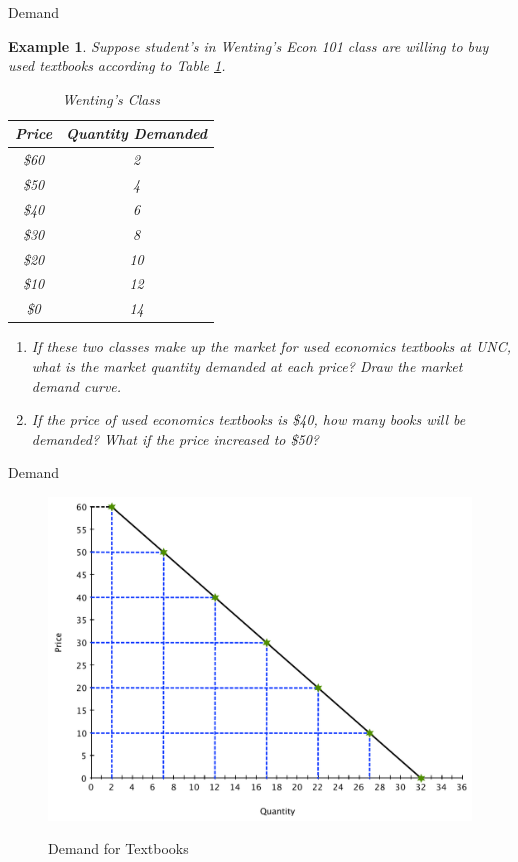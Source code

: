\documentclass[xcolor={dvipsnames},pdf, hyperref={colorlinks=true, citecolor=ForestGreen, linkcolor=BlueViolet, urlcolor=Magenta}]{beamer}
\newtheorem{exmp}{Example}[section]
\theoremstyle{definition}
\newcommand{\ddp}[1]{{\textcolor{ForestGreen}{#1}}}
\begin{document}
\begin{frame}{Demand}
		\begin{exmp} 
			\scriptsize	
				Suppose student's in Wenting's Econ 101 class are willing to buy used textbooks according to Table \ref{tab2}.
				
				\begin{table}[ht]
					\caption{Wenting's Class}
					\label{tab2}
					\centering
					\begin{tabular}{  c|c}        
						
						Price   & Quantity Demanded \\
						\hline
						\$60 & 2 \\
						\$50 & 4 \\
						\$40 & 6 \\
						\$30 &  8 \\
						\$20& 10 \\
						\$10 & 12 \\
						\$0 & 14 \\
					\end{tabular}
				\end{table} 
				
			\begin{enumerate}
			\item 	If these two classes make up the market for used economics textbooks at UNC, what is the market quantity demanded at each price? Draw the market demand curve.
	
			\item 	If the price of used economics textbooks is \$40, how many books will be demanded? What if the price increased to \$50? 
			\end{enumerate}
			\end{exmp}
		
	
		
	\end{frame}


\begin{frame}[b]{Demand}
		\begin{figure}[H]
			\centering
			\ddp{\includegraphics[scale=.30]{plot8.pdf}}
			\caption{Demand for Textbooks}
		\end{figure}
	\end{frame}
\end{document}
